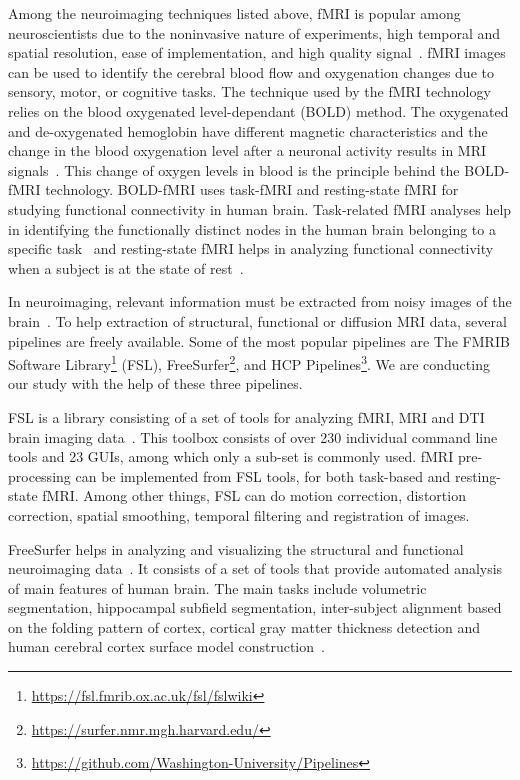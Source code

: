 Among the neuroimaging techniques listed above, fMRI is popular among neuroscientists due to the noninvasive nature of experiments, high temporal and spatial resolution, ease of implementation, and high quality signal~\cite{Bandettini2009}. fMRI images can be used to identify the cerebral blood flow and oxygenation changes due to sensory, motor, or cognitive tasks. The technique used by the fMRI technology relies on the blood oxygenated level-dependant (BOLD) method. The oxygenated and de-oxygenated hemoglobin have different magnetic characteristics and the change in the blood oxygenation level after a neuronal activity results in MRI signals~\cite{doi:10.1177/0883073807313047}. This change of oxygen levels in blood is the principle behind the BOLD-fMRI technology. BOLD-fMRI uses task-fMRI and resting-state fMRI for studying functional connectivity in human brain. Task-related fMRI analyses help in identifying the functionally distinct nodes in the human brain belonging to a specific task~\cite{task_fmri} and resting-state fMRI helps in analyzing functional connectivity when a subject is at the state of rest~\cite{SMITH2013144}.


In neuroimaging, relevant information must be extracted from noisy images of the brain~\cite{WOOLRICH2009S173}. To help extraction of structural, functional or diffusion MRI data, several pipelines are freely available. Some of the most popular pipelines are The FMRIB Software Library\footnote{\url{https://fsl.fmrib.ox.ac.uk/fsl/fslwiki}} (FSL), FreeSurfer\footnote{\url{https://surfer.nmr.mgh.harvard.edu/}}, and HCP Pipelines\footnote{\url{https://github.com/Washington-University/Pipelines}}. We are conducting our study with the help of these three pipelines.
 
FSL is a library consisting of a set of tools for analyzing fMRI, MRI and DTI brain imaging data~\cite{JENKINSON2012782}. This toolbox consists of over 230 individual command line tools and 23 GUIs, among which only a sub-set is commonly used. fMRI pre-processing can be implemented from FSL tools, for both task-based and resting-state fMRI. Among other things, FSL can do motion correction, distortion correction, spatial smoothing, temporal filtering and registration of images.

FreeSurfer helps in analyzing and visualizing the structural and functional neuroimaging data~\cite{freesurfer_website}. It consists of a set of tools that provide automated analysis of main features of human brain. The main tasks include volumetric segmentation, hippocampal subfield segmentation, inter-subject alignment based on the folding pattern of cortex, cortical gray matter thickness detection and human cerebral cortex surface model construction~\cite{Fischl2012}. 

